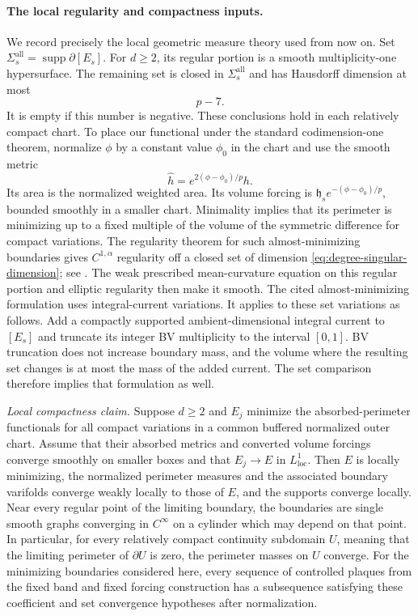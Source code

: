 \paragraph{The local regularity and compactness inputs.}
We record precisely the local geometric measure theory used from now on.
Set $\Sigma_s^{\mathrm{all}}=\operatorname{supp}\partial[E_s]$.  For
$d\ge2$, its regular portion is a smooth multiplicity-one hypersurface.
The remaining set is closed in $\Sigma_s^{\mathrm{all}}$ and has Hausdorff
dimension at most
\begin{equation}\label{eq:degree-singular-dimension}
                              p-7.
\end{equation}
It is empty if this number is negative.  These conclusions hold in each
relatively compact chart.  To place our functional under the standard
codimension-one theorem, normalize $\phi$ by a constant value $\phi_0$
in the chart and use the smooth metric
\[
                  \widehat h=e^{2(\phi-\phi_0)/p}h.
\]
Its area is the normalized weighted area.  Its volume forcing is
$\mathfrak h_s e^{-(\phi-\phi_0)/p}$, bounded smoothly in a smaller chart.
Minimality implies that its perimeter is minimizing up to a fixed
multiple of the volume of the symmetric difference for compact
variations.  The regularity theorem for such almost-minimizing boundaries
gives $C^{1,\alpha}$ regularity off a closed set of dimension
\eqref{eq:degree-singular-dimension}; see
\cite[Theorem A.1 and Remark A.3]{Eichmair2009}.  The weak prescribed
mean-curvature equation on this regular portion and elliptic regularity
then make it smooth.  The cited almost-minimizing formulation uses
integral-current variations.  It applies to these set variations as
follows.  Add a compactly supported ambient-dimensional integral current
to $[E_s]$ and truncate its integer BV multiplicity to the interval
$[0,1]$.  BV truncation does not increase boundary mass, and the volume
where the resulting set changes is at most the mass of the added current.
The set comparison therefore implies that formulation as well.

\emph{Local compactness claim.}
Suppose $d\ge2$ and $E_j$ minimize the absorbed-perimeter functionals
for all compact variations in a common buffered normalized outer chart.
Assume that their absorbed metrics and converted volume forcings
converge smoothly on smaller boxes and that $E_j\to E$ in
$L^1_{\mathrm{loc}}$.  Then $E$ is locally minimizing, the normalized
perimeter measures and the associated boundary varifolds converge
weakly locally to those of $E$, and the supports converge locally.
Near every regular point of the limiting boundary, the boundaries are
single smooth graphs converging in $C^\infty$ on a cylinder which may
depend on that point.  In particular, for every relatively compact
continuity subdomain $U$, meaning that the limiting perimeter of
$\partial U$ is zero, the perimeter masses on $U$ converge.  For the
minimizing boundaries considered here, every sequence of controlled
plaques from the fixed band and fixed forcing construction has a
subsequence satisfying these coefficient and set convergence hypotheses
after normalization.

